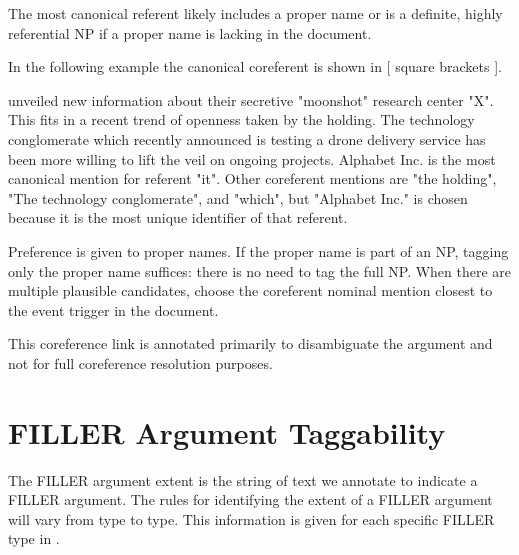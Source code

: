 The most canonical referent likely includes a proper name or is a definite, highly referential NP if a proper name is lacking in the document.

In the following example the canonical coreferent is shown in [ square brackets ].
\begin{exe}
     unveiled new information about their secretive "moonshot" research center "X". This fits in a recent trend of openness taken by the holding. The technology conglomerate which recently announced  is testing a drone delivery service has been more willing to lift the veil on ongoing projects.
        \expl Alphabet Inc. is the most canonical mention for referent "it". Other coreferent mentions are "the holding", "The technology conglomerate", and "which", but "Alphabet Inc." is chosen because it is the most unique identifier of that referent.
\end{exe}

Preference is given to proper names.
If the proper name is part of an NP, tagging only the proper name suffices: there is no need to tag the full NP.
When there are multiple plausible candidates, choose the coreferent nominal mention closest to the event trigger in the document.

This coreference link is annotated primarily to disambiguate the argument and not for full coreference resolution purposes.

 
\section{FILLER Argument Taggability} \label{sec:FILLERargtagg}
The FILLER argument extent is the string of text we annotate to indicate a FILLER argument.
The rules for identifying the extent of a FILLER argument will vary from type to type.
This information is given for each specific FILLER type in .

